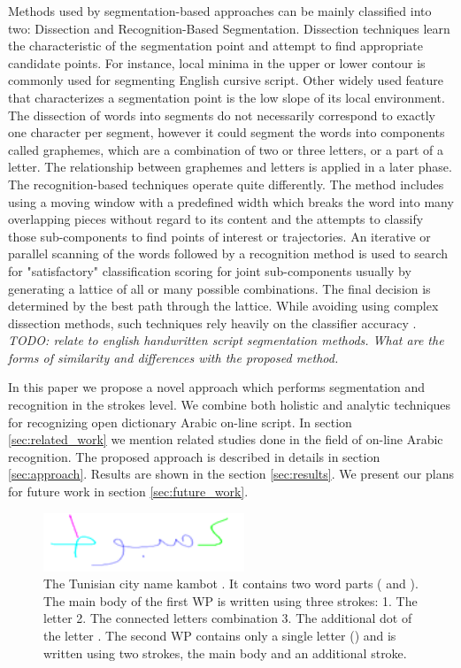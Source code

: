 \documentclass[journal,compsoc]{IEEEtran}
\begin{document}
Methods used by segmentation-based approaches can be mainly classified into two: Dissection and Recognition-Based Segmentation. Dissection techniques learn the characteristic of the segmentation point and attempt to find appropriate candidate points. For instance, local minima in the upper or lower contour is commonly used for segmenting English cursive script. Other widely used feature that characterizes a segmentation point is the low slope of its local environment. The dissection of words into segments do not necessarily correspond to exactly one character per segment, however it could segment the words into components called graphemes, which are a combination of two or three letters, or a part of a letter. The relationship between graphemes and letters is applied in a later phase. The recognition-based techniques operate quite differently. The method includes using a moving window with a predefined width which breaks the word into many overlapping pieces without regard to its content and the attempts to classify those sub-components to find points of interest or trajectories. An iterative or parallel scanning of the words followed by a recognition method is used to search for "satisfactory" classification scoring for joint sub-components usually by generating a lattice of all or many possible combinations. The final decision is determined by the best path through the lattice. While avoiding using complex dissection methods, such techniques rely heavily on the classifier accuracy \cite{casey1996survey}. \\

\emph{TODO: relate to english handwritten script segmentation methods. What are the forms of similarity and differences with the proposed method.}

In this paper we propose a novel approach which performs segmentation and recognition in the strokes level. We combine both holistic and analytic techniques for recognizing open dictionary Arabic on-line script. In section \ref{sec:related_work} we mention related studies done in the field of on-line Arabic recognition. The proposed approach is described in details in section \ref{sec:approach}. Results are shown in the section \ref{sec:results}. We present our plans for future work in section \ref{sec:future_work}.

\begin{figure}
\centering
\includegraphics[width=6cm]{./figures/kmbot_color}       
\caption{The Tunisian city name kambot . It contains two word parts ( and ). The main body of the first WP is written using three strokes: 1. The letter  2. The connected letters combination  3. The additional dot of the letter . The second WP contains only a single letter () and is written using two strokes, the main body and an additional stroke.}
\label{fig:kmbot}
\end{figure}
\end{document}
